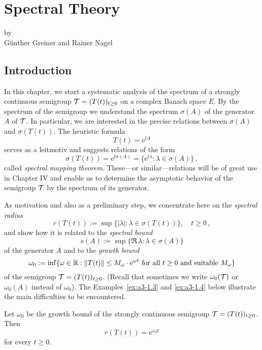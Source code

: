 \chapter{Spectral Theory}\label{chap:a3}
{\Large
\vspace*{-.75cm}
by \\[.25em]
Günther Greiner and Rainer Nagel 
\vspace{.75cm}
\\
}
\section{Introduction}
In this chapter, we start a systematic analysis of the spectrum of a strongly continuous semigroup $\mathcal{T} = (T(t))_{t\geq 0}$ on a complex Banach space $E$.
By the spectrum of the semigroup we understand the spectrum $\sigma(A)$ of the generator $A$ of $\mathcal{T}$.
In particular, we are interested in the precise relations between $\sigma(A)$ and $\sigma(T(t))$.
The heuristic formula
\[
	T(t) = \mathrm{e}^{tA}
\]
serves as a leitmotiv and suggests relations of the form
\[
\sigma(T(t)) = \mathrm{e}^{t\sigma(A)} = \{ \mathrm{e}^{t\lambda} \colon \lambda \in \sigma(A) \}\,,
\]
called \emph{spectral mapping theorem}.
These---or similar---relations will be of great use in Chapter IV and enable us to determine the asymptotic behavior of the semigroup $\mathcal{T}$ by the spectrum of its generator.

As motivation and also as a preliminary step, we concentrate here on the \emph{spectral radius}
\begin{equation}\label{eq:a3-1.1}
	r(T(t)) := \sup \{ |\lambda| : \lambda \in \sigma(T(t)) \}, \quad t \geq 0\,,
\end{equation}
and show how it is related to the \emph{spectral bound}
\begin{equation}\label{eq:a3-1.2}
	s(A) := \sup \{ \Re\,\lambda : \lambda \in \sigma(A) \}
\end{equation}
of the generator $A$ and to the \emph{growth bound}
\begin{equation}\label{eq:a3-1.3}
	\omega_{0} := \inf \{\omega \in \mathbb{R}  : \|T(t)\| \leq M_{\omega}\cdot \mathrm{e}^{\omega t} \text{ for all } t \geq 0 \text{ and suitable } M_{\omega}\}
\end{equation}
of the semigroup $\mathcal{T} = (T(t))_{t\geq 0}$.
(Recall that sometimes we write $\omega_{0}(\mathcal{T})$ or $\omega_{0}(A)$ instead of $\omega_{0}$).
%
The Examples~\ref{ex:a3-1.3} and \ref{ex:a3-1.4} below illustrate the main difficulties to be encountered.
\begin{proposition}\label{prop:a3-1.1}
Let $\omega_{0}$ be the growth bound of the strongly continuous semigroup $\mathcal{T} = (T(t))_{t\geq 0}$.
Then
\begin{equation}\label{eq:a3-1.4}
	r(T(t)) = \mathrm{e}^{\omega_{0} t}
\end{equation}
for every $t \geq 0$.
\end{proposition}

